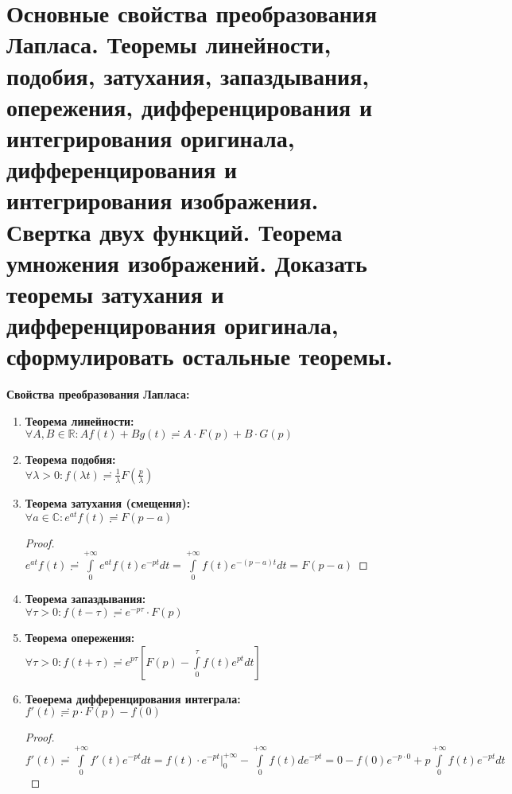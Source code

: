 \newpage
\section{Основные свойства преобразования Лапласа. Теоремы линейности, подобия, затухания, запаздывания, опережения, дифференцирования и интегрирования оригинала, дифференцирования и интегрирования изображения. Свертка двух функций. Теорема умножения изображений. Доказать теоремы затухания и дифференцирования оригинала, сформулировать остальные теоремы.}

\textbf{Свойства преобразования Лапласа:}

\begin{enumerate}
    \item \textbf{Теорема линейности:}\\
    $\forall A, B \in \mathbb{R}: Af(t)+Bg(t)\risingdotseq A\cdot F(p)+B\cdot G(p)$
    \item \textbf{Теорема подобия:}\\
    $\forall \lambda > 0: f(\lambda t) \risingdotseq \frac{1}{\lambda} F\left(\frac{p}{\lambda}\right)$
    \item \textbf{Теорема затухания (смещения):}\\
    $\forall a \in \mathbb{C}: e^{at}f(t)\risingdotseq F(p-a)$\\
    \begin{proof}
        \ \\
        $e^{at}f(t)\risingdotseq \int\limits_0^{+\infty} e^{at}f(t)e^{-pt}dt=\int\limits_0^{+\infty}f(t)e^{-(p-a)t}dt=F(p-a)$
    \end{proof}
    \item \textbf{Теорема запаздывания:}\\
    $\forall \tau > 0: f(t-\tau) \risingdotseq e^{-p\tau}\cdot F(p)$
    \item \textbf{Теорема опережения:}\\
    $\forall \tau > 0: f(t+\tau) \risingdotseq e^{p\tau}\left[F(p)-\int\limits_0^{\tau}f(t)e^{pt}dt\right]$
    \item \textbf{Теоерема дифференцирования интеграла:}\\
    $f'(t)\risingdotseq p\cdot F(p) -f(0)$
    \begin{proof}
        \ \\
        $f'(t)\risingdotseq \int\limits_0^{+\infty}f'(t)e^{-pt}dt = f(t)\cdot e^{-pt}\bigg|_0^{+\infty} -\int\limits_0^{+\infty} f(t) de^{-pt} = 0 -f(0)e^{-p\cdot 0}+p\int\limits_0^{+\infty}f(t)e^{-pt}dt$\\

\end{proof}
\end{enumerate}
